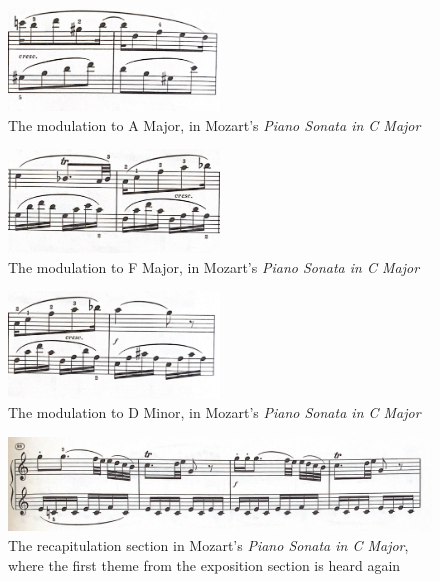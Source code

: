 \begin{figure}
    \centering
    \includegraphics[width=0.5\textwidth]{figures/mozart-first-movement-modulation-a-major.jpg}
    \caption{The modulation to A Major, in Mozart's \textit{Piano Sonata in C Major}}
    \label{fig:mozart-first-movement-modulation-a-major}
\end{figure}

\begin{figure}
    \centering
    \includegraphics[width=0.5\textwidth]{figures/mozart-first-movement-f-major.jpg}
    \caption{The modulation to F Major, in Mozart's \textit{Piano Sonata in C Major}}
    \label{fig:mozart-first-movement-f-major}
\end{figure}

\begin{figure}
    \centering
\includegraphics[width=0.5\textwidth]{figures/mozart-first-movement-d-minor.jpg}
    \caption{The modulation to D Minor, in Mozart's \textit{Piano Sonata in C Major}}
    \label{fig:mozart-first-movement-d-minor}
\end{figure}

\begin{figure}
    \centering
    \includegraphics[width=\textwidth]{figures/mozart-first-movement-recapitulation-first-theme.jpg}
    \caption[The first theme of the exposition, found in the recapitulation, from Mozart's \textit{Piano Sonata in C Major, K. 330}]{The recapitulation section in Mozart's \textit{Piano Sonata in C Major}, where the first theme from the exposition section is heard again}
    \label{fig:mozart-first-movement-recapitulation-first-theme}
\end{figure}

